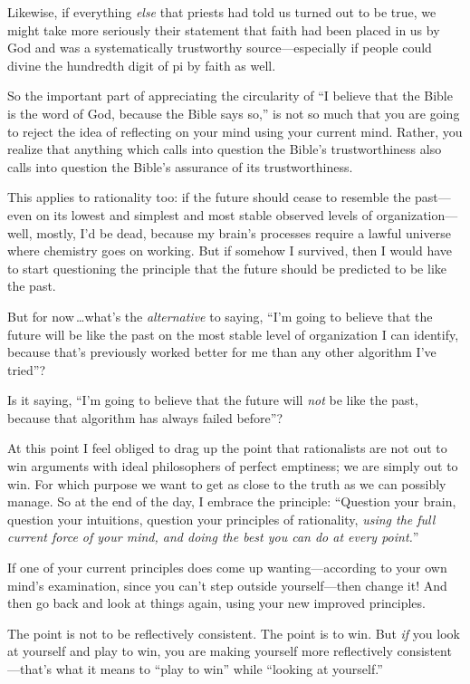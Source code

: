  Likewise, if everything \textit{else} that priests had told us
turned out to be true, we might take more seriously their statement
that faith had been placed in us by God and was a systematically
trustworthy source---especially if people could divine the hundredth
digit of pi by faith as well.


 So the important part of appreciating the circularity of
``I believe that the Bible is the word of God, because
the Bible says so,'' is not so much that you are
going to reject the idea of reflecting on your mind using your current
mind. Rather, you realize that anything which calls into question the
Bible's trustworthiness also calls into question the
Bible's assurance of its trustworthiness.


 This applies to rationality too: if the future should cease to
resemble the past---even on its lowest and simplest and most stable
observed levels of organization---well, mostly, I'd be
dead, because my brain's processes require a lawful
universe where chemistry goes on working. But if somehow I survived,
then I would have to start questioning the principle that the future
should be predicted to be like the past.


 But for now\,\ldots what's the \textit{alternative}
to saying, ``I'm going to believe that
the future will be like the past on the most stable level of
organization I can identify, because that's previously
worked better for me than any other algorithm I've
tried''?


 Is it saying, ``I'm going to
believe that the future will \textit{not} be like the past, because
that algorithm has always failed before''?

{
 At this point I feel obliged to drag up the point that
rationalists are not out to win arguments with ideal philosophers of
perfect emptiness; we are simply out to win. For which purpose we want
to get as close to the truth as we can possibly manage. So at the end
of the day, I embrace the principle: ``Question your
brain, question your intuitions, question your principles of
rationality, \textit{using the full current force of your mind, and
doing the best you can do at every point.}''}


 If one of your current principles does come up wanting---according
to your own mind's examination, since you
can't step outside yourself{}---then change it! And
then go back and look at things again, using your new improved
principles.


 The point is not to be reflectively consistent. The point is to
win. But \textit{if} you look at yourself and play to win, you are
making yourself more reflectively consistent---that's
what it means to ``play to win''
while ``looking at yourself.''


